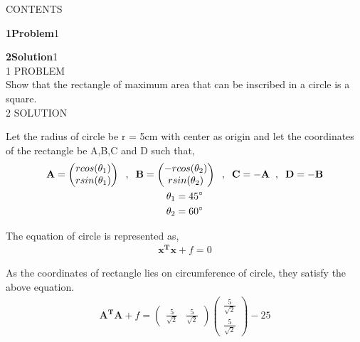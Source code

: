 \documentclass[a4,10pt]{report}
\newcommand{\myvec}[1]{\ensuremath{\begin{pmatrix}#1\end{pmatrix}}}
\let\vec\mathbf
\begin{document}
\begin{multicols}{2}
\centering \large\textsc{C}\footnotesize\textsc{ONTENTS}\vspace{5mm}\\
\raggedright\large\textbf{1\hspace{1cm}Problem}\hspace{5.2cm}1\vspace{5mm}\\
\raggedright\large\textbf{2\hspace{1cm}Solution}\hspace{5.25cm}1\vspace{5mm}\\
\centering \large\textsc{1  P}\footnotesize\textsc{ROBLEM}\vspace{5mm}\\
Show that the rectangle of maximum area that can be inscribed in a circle is a square.\vspace{5mm}\\
\centering \large\textsc{2  S}\footnotesize\textsc{OLUTION}\vspace{5mm}\\
\raggedright Let the radius of circle be r = 5cm with center as origin and let the coordinates of the rectangle be A,B,C and D such that,
	\begin{gather*}
		\vec{A} = \myvec{rcos(\theta_1)\\rsin(\theta_1)}\hspace{2mm},\hspace{2mm}\vec{B} = \myvec{-rcos(\theta_2)\\rsin(\theta_2)}\hspace{2mm},\hspace{2mm}\vec{C} = -\vec{A}\hspace{2mm},\hspace{2mm}\vec{D} = -\vec{B}\\
		\theta_1 = 45\degree\\
		\theta_2 = 60\degree
	\end{gather*}
\raggedright The equation of circle is represented as,
	\begin{gather}
		\vec{x^T}\vec{x} + f = 0
	\end{gather}
	\vspace{2mm}
\raggedright As the coordinates of rectangle lies on circumference of  circle, they satisfy the above equation.\\
	\begin{gather*}
		\vec{A^T}\vec{A} + f = \myvec{\frac{5}{\sqrt{2}} & \frac{5}{\sqrt{2}}}\myvec{\frac{5}{\sqrt{2}} \\ \frac{5}{\sqrt{2}}} -25\\

\end{gather*}
\end{multicols}
\end{document}
